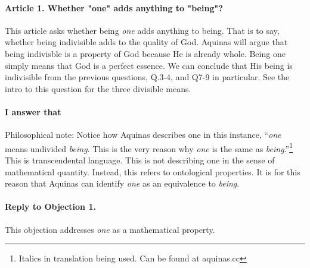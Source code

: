 \documentclass{ucetd}
\begin{document}
\paragraph{Article 1. Whether "one" adds anything to "being"?}
This article asks whether being \textit{one} adds anything to being. That is to say, whether being indivisible adds to the quality of God. Aquinas will argue that being indivisble is a property of God because He is already whole. Being one simply means that God is a perfect essence. We can conclude that His being is indivisible from the previous questions, Q.3-4, and Q7-9 in particular. See the intro to this question for the three divisible means.
\paragraph{I answer that}
Philosophical note: Notice how Aquinas describes one in this instance, ``\textit{one} means undivided \textit{being}. This is the very reason why \textit{one} is the same as \textit{being}.''\footnote{Italics in translation being used. Can be found at aquinas.cc} This is transcendental language. This is not describing one in the sense of mathematical quantity. Instead, this refers to ontological properties. It is for this reason that Aquinas can identify \textit{one} as an equivalence to \textit{being}.
\paragraph{Reply to Objection 1.}
This objection addresses \textit{one} as a mathematical property.
\end{document}
